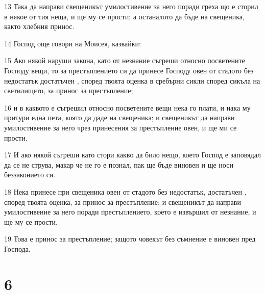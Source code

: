 \par 13 Така да направи свещеникът умилостивение за него поради греха що е сторил в някое от тия неща, и ще му се прости; а останалото да бъде на свещеника, както хлебния принос.
\par 14 Господ още говори на Моисея, казвайки:
\par 15 Ако някой наруши закона, като от незнание съгреши относно посветените Господу вещи, то за престъплението си да принесе Господу овен от стадото без недостатък достатъчен , според твоята оценка в сребърни сикли според сикъла на светилището, за принос за престъпление;
\par 16 и в каквото е съгрешил относно посветените вещи нека го плати, и нака му притури една пета, която да даде на свещеника; и свещеникът да направи умилостивение за него чрез принесения за престъпление овен, и ще ми се прости.
\par 17 И ако някой съгреши като стори какво да било нещо, което Господ е заповядал да се не струва, макар че не го е познал, пак ще бъде виновен и ще носи беззаконието си.
\par 18 Нека принесе при свещеника овен от стадото без недостатък, достатъчен , според твоята оценка, за принос за престъпление; и свещеникът да направи умилостивение за него поради престъплението, което е извършил от незнание, и ще му се прости.
\par 19 Това е принос за престъпление; защото човекът без съмнение е виновен пред Господа.

\chapter{6}

